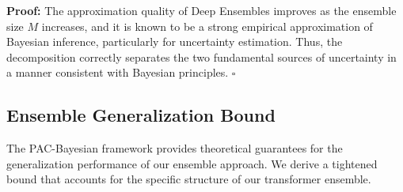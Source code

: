 \documentclass[journal]{IEEEtran}
\newenvironment{proof}{\par\medskip\noindent \textbf{Proof:} \rmfamily}{\hfill$\square$\medskip}
\begin{document}
\begin{proof}
The approximation quality of Deep Ensembles improves as the ensemble size $M$ increases, and it is known to be a strong empirical approximation of Bayesian inference, particularly for uncertainty estimation. Thus, the decomposition correctly separates the two fundamental sources of uncertainty in a manner consistent with Bayesian principles.
\end{proof}

\subsection{Ensemble Generalization Bound}

The PAC-Bayesian framework provides theoretical guarantees for the generalization performance of our ensemble approach. We derive a tightened bound that accounts for the specific structure of our transformer ensemble.
\end{document}
